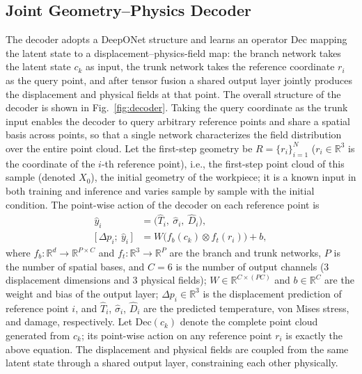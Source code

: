 \subsection{Joint Geometry--Physics Decoder}
The decoder adopts a DeepONet structure and learns an operator $\mathrm{Dec}$ mapping the latent state to a displacement--physics-field map: the branch network takes the latent state $c_k$ as input, the trunk network takes the reference coordinate $r_i$ as the query point, and after tensor fusion a shared output layer jointly produces the displacement and physical fields at that point. The overall structure of the decoder is shown in Fig.~\ref{fig:decoder}. Taking the query coordinate as the trunk input enables the decoder to query arbitrary reference points and share a spatial basis across points, so that a single network characterizes the field distribution over the entire point cloud. Let the first-step geometry be $R=\{r_i\}_{i=1}^{N}$ ($r_i\in\mathbb{R}^{3}$ is the coordinate of the $i$-th reference point), i.e., the first-step point cloud of this sample (denoted $X_0$), the initial geometry of the workpiece; it is a known input in both training and inference and varies sample by sample with the initial condition. The point-wise action of the decoder on each reference point is
\begin{equation}
\begin{aligned}
\hat{y}_i&=\big(\hat{T}_i,\ \hat{\sigma}_i,\ \hat{D}_i\big),\\
\big[\,\Delta p_i;\ \hat{y}_i\,\big]&=W\big(f_{b}(c_k)\otimes f_{t}(r_i)\big)+b,
\end{aligned}
\end{equation}
where $f_{b}:\mathbb{R}^{d}\to\mathbb{R}^{P\times C}$ and $f_{t}:\mathbb{R}^{3}\to\mathbb{R}^{P}$ are the branch and trunk networks, $P$ is the number of spatial bases, and $C=6$ is the number of output channels (3 displacement dimensions and 3 physical fields); $W\in\mathbb{R}^{C\times(PC)}$ and $b\in\mathbb{R}^{C}$ are the weight and bias of the output layer; $\Delta p_i\in\mathbb{R}^{3}$ is the displacement prediction of reference point $i$, and $\hat{T}_i$, $\hat{\sigma}_i$, $\hat{D}_i$ are the predicted temperature, von Mises stress, and damage, respectively. Let $\mathrm{Dec}(c_k)$ denote the complete point cloud generated from $c_k$; its point-wise action on any reference point $r_i$ is exactly the above equation. The displacement and physical fields are coupled from the same latent state through a shared output layer, constraining each other physically.

